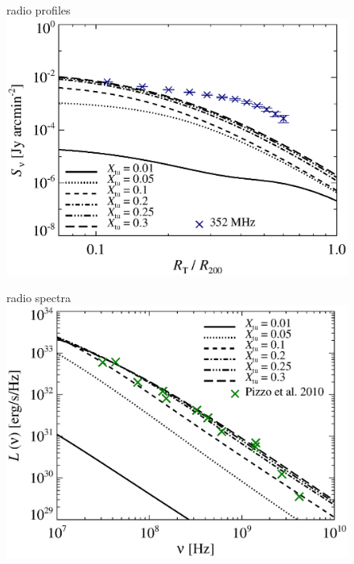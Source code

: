 \documentclass[fleqn,usenatbib,useAMS]{mnras}
\begin{document}
\begin{figure}
\begin{minipage}{1\columnwidth}
   \begin{center}\Large{radio profiles}\\
     \includegraphics[width=\columnwidth]{tcltD.prof.comp.KrTTDth.Xtu.eps}
   \end{center}
\end{minipage}
\begin{minipage}{1\columnwidth}
   \begin{center}\Large{radio spectra}\\
     \includegraphics[width=\columnwidth]{tcltD.spec.comp.KrTTDth.Xtu.eps}
   \end{center}

\end{minipage}
\end{figure}
\end{document}
